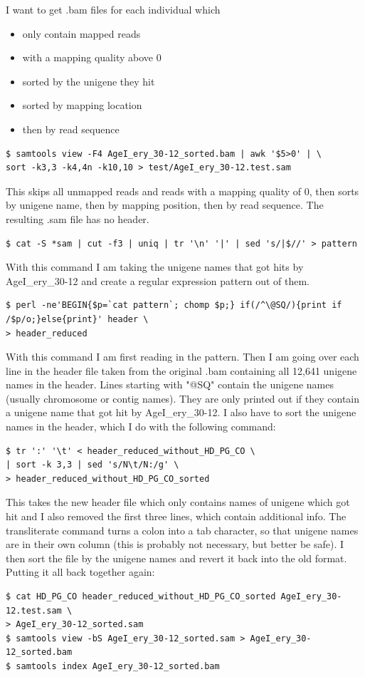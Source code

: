 \documentclass{article}\usepackage[]{graphicx}\usepackage[]{color}
\begin{document}
I want to get .bam files for each individual which
\begin{itemize}
\item only contain mapped reads 
\item with a mapping quality above 0
\item sorted by the unigene they hit
\item sorted by mapping location 
\item then by read sequence
\end{itemize}

\begin{Verbatim}
$ samtools view -F4 AgeI_ery_30-12_sorted.bam | awk '$5>0' | \
sort -k3,3 -k4,4n -k10,10 > test/AgeI_ery_30-12.test.sam
\end{Verbatim}
This skips all unmapped reads and reads with a mapping quality of 0, then sorts by unigene name, then by mapping position, then by read sequence. The resulting .sam file has no header.

\begin{Verbatim}
$ cat -S *sam | cut -f3 | uniq | tr '\n' '|' | sed 's/|$//' > pattern
\end{Verbatim}
With this command I am taking the unigene names that got hits by AgeI\_ery\_30-12 and create a regular expression pattern out of them.

\begin{Verbatim}
$ perl -ne'BEGIN{$p=`cat pattern`; chomp $p;} if(/^\@SQ/){print if /$p/o;}else{print}' header \
> header_reduced
\end{Verbatim}
With this command I am first reading in the pattern. Then I am going over each line in the header file taken from the original .bam containing all 12,641 unigene names in the header. Lines starting with "@SQ" contain the unigene names (usually chromosome or contig names). They are only printed out if they contain a unigene name that got hit by AgeI\_ery\_30-12. I also have to sort the unigene names in the header, which I do with the following command:
\begin{Verbatim}
$ tr ':' '\t' < header_reduced_without_HD_PG_CO \
| sort -k 3,3 | sed 's/N\t/N:/g' \
> header_reduced_without_HD_PG_CO_sorted
\end{Verbatim}
This takes the new header file which only contains names of unigene which got hit and I also removed the first three lines, which contain additional info. The transliterate command turns a colon into a tab character, so that unigene names are in their own column (this is probably not necessary, but better be safe). I then sort the file by the unigene names and revert it back into the old format. Putting it all back together again:
\begin{Verbatim}
$ cat HD_PG_CO header_reduced_without_HD_PG_CO_sorted AgeI_ery_30-12.test.sam \
> AgeI_ery_30-12_sorted.sam
$ samtools view -bS AgeI_ery_30-12_sorted.sam > AgeI_ery_30-12_sorted.bam
$ samtools index AgeI_ery_30-12_sorted.bam
\end{Verbatim}
\end{document}
